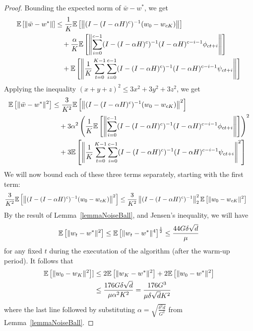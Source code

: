 \begin{proof}
Bounding the expected norm of $\bar{w} - w^*$, we get
\begin{align*}
    \mathbb{E}\left[ \|\bar{w} - w^*\| \right] & \leq \frac{1}{K}\mathbb{E}\left[ \left\|(I-(I - \alpha H)^c)^{-1} (w_0 - w_{cK})\right\| \right] \\
                            & \quad + \frac{\alpha}{K} \mathbb{E}\left[ \left\|\sum_{i=0}^{c-1} (I - (I-\alpha H)^c)^{-1} (I - \alpha H)^{c-i-1} \phi_{ct+i}\right\| \right] \\ 
                            & \quad + \mathbb{E}\left[ \left\|\frac{1}{K}\sum_{t=0}^{K-1}\sum_{i=0}^{c-1}(I - (I - \alpha H)^c)^{-1} (I - \alpha H )^{c-i-1} \psi_{ct+i}\right\| \right]
\end{align*}
Applying the inequality $(x+y+z)^2 \leq 3x^2+3y^2+3z^2$, we get
\begin{align*}
    \mathbb{E}\left[ \|\bar{w} - w^*\|^2 \right] & \leq \frac{3}{K^2}\mathbb{E}\left[ \left\|(I-(I - \alpha H)^c)^{-1} (w_0 - w_{cK})\right\|^2 \right] \\
                            & \quad + 3 \alpha^2\left(\frac{1}{K} \mathbb{E}\left[ \left\|\sum_{i=0}^{c-1} (I - (I-\alpha H)^c)^{-1} (I - \alpha H)^{c-i-1} \phi_{ct+i}\right\| \right]\right)^2 \\ 
                            & \quad + 3\mathbb{E}\left[ \left\|\frac{1}{K}\sum_{t=0}^{K-1}\sum_{i=0}^{c-1}(I - (I - \alpha H)^c)^{-1} (I - \alpha H )^{c-i-1} \psi_{ct+i}\right\|^2 \right]
\end{align*}
We will now bound each of these three terms separately, starting with the first term:
\begin{align*}
    \frac{3}{K^2}\mathbb{E}\left[ \left\| (I - (I - \alpha H)^c)^{-1} ( w_0 - w_{cK}) \right\|^2 \right] 
    & \leq \frac{3}{K^2}\left\| (I - (I - \alpha H)^c)^{-1}\right\|_2^2 \mathbb{E}\left[ \|w_0 - w_{cK}\|^2 \right]
\end{align*}
By the result of Lemma~\ref{lemmaNoiseBall}, and Jensen's inequality, we will have
\begin{align*}
    \mathbb{E}\left[ \|w_t - w^*\|^2 \right] \leq \mathbb{E}\left[ \|w_t - w^*\|^4 \right]^{\frac{1}{2}} \leq \frac{44G\delta \sqrt{d}}{\mu}
\end{align*}
for any fixed $t$ during the executation of the algorithm (after the warm-up period). It follows that
\begin{align*}
    \mathbb{E}\left[ \|w_0 - w_K\|^2 \right]] 
    &\leq 2\mathbb{E}\left[ \|w_K - w^*\|^2 \right] + 2 \mathbb{E}\left[ \|w_0 - w^*\|^2 \right] \\
    &\leq \frac{176 G \delta \sqrt{d}}{\mu \alpha^2 K^2} = \frac{176 G^3}{\mu \delta \sqrt{d} K^2}
\end{align*}
where the last line followed by substituting $\alpha = \sqrt{\frac{\delta^2 d}{G^2}}$ from Lemma~\ref{lemmaNoiseBall}.

\end{proof}
